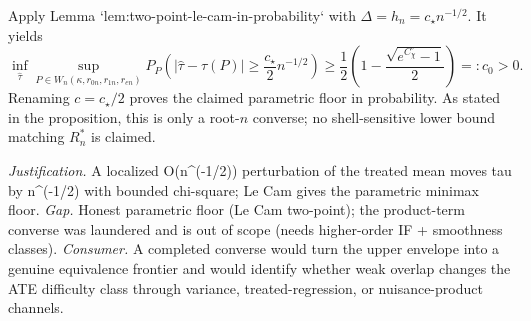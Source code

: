 \documentclass{article}
\begin{document}
Apply Lemma `lem:two-point-le-cam-in-probability` with
$\Delta=h_n=c_\star n^{-1/2}$. It yields
\[
\inf_{\hat\tau}\sup_{P\in W_n(\kappa,r_{0n},r_{1n},r_{en})}
P_P\!\left(|\hat\tau-\tau(P)|\ge \frac{c_\star}{2}n^{-1/2}\right)
\ge \frac12\left(1-\frac{\sqrt{e^{C_\chi^\circ}-1}}{2}\right)=:c_0>0.
\]
Renaming $c=c_\star/2$ proves the claimed parametric floor in probability. As stated in the
proposition, this is only a root-$n$ converse; no shell-sensitive lower bound matching
$R_n^*$ is claimed.
\par\smallskip\noindent \textit{Justification.} A localized O(n^(-1/2)) perturbation of the treated mean moves tau by n^(-1/2) with bounded chi-square; Le Cam gives the parametric minimax floor. \textit{Gap.} Honest parametric floor (Le Cam two-point); the product-term converse was laundered and is out of scope (needs higher-order IF + smoothness classes). \textit{Consumer.} A completed converse would turn the upper envelope into a genuine equivalence frontier and would identify whether weak overlap changes the ATE difficulty class through variance, treated-regression, or nuisance-product channels.
\end{document}

